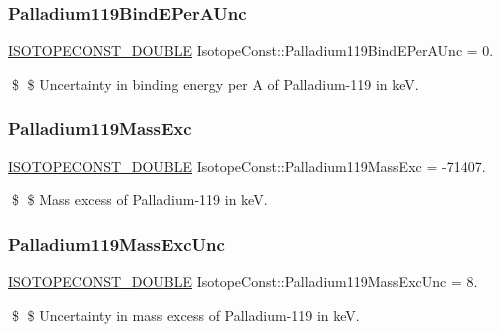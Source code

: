 \subsubsection{\texorpdfstring{Palladium119\+Bind\+E\+Per\+A\+Unc}{Palladium119BindEPerAUnc}}
{\footnotesize\ttfamily \mbox{\hyperlink{group___isotope_const-_macros_ga8f45a7272ce02c0b4c65c44636ed719a}{I\+S\+O\+T\+O\+P\+E\+C\+O\+N\+S\+T\+\_\+\+D\+O\+U\+B\+LE}} Isotope\+Const\+::\+Palladium119\+Bind\+E\+Per\+A\+Unc = 0.}

\$ \$ Uncertainty in binding energy per A of Palladium-\/119 in keV. \mbox{\label{group___isotope_const-_palladium-_pd119_ga68a420347c7b17585263f21ae209e288}} 
\subsubsection{\texorpdfstring{Palladium119\+Mass\+Exc}{Palladium119MassExc}}
{\footnotesize\ttfamily \mbox{\hyperlink{group___isotope_const-_macros_ga8f45a7272ce02c0b4c65c44636ed719a}{I\+S\+O\+T\+O\+P\+E\+C\+O\+N\+S\+T\+\_\+\+D\+O\+U\+B\+LE}} Isotope\+Const\+::\+Palladium119\+Mass\+Exc = -\/71407.}

\$ \$ Mass excess of Palladium-\/119 in keV. \mbox{\label{group___isotope_const-_palladium-_pd119_ga58e3d4bc649b297a4511cd073af84ca7}} 
\subsubsection{\texorpdfstring{Palladium119\+Mass\+Exc\+Unc}{Palladium119MassExcUnc}}
{\footnotesize\ttfamily \mbox{\hyperlink{group___isotope_const-_macros_ga8f45a7272ce02c0b4c65c44636ed719a}{I\+S\+O\+T\+O\+P\+E\+C\+O\+N\+S\+T\+\_\+\+D\+O\+U\+B\+LE}} Isotope\+Const\+::\+Palladium119\+Mass\+Exc\+Unc = 8.}

\$ \$ Uncertainty in mass excess of Palladium-\/119 in keV. \mbox{\label{group___isotope_const-_palladium-_pd119_gaf323475ee1b2456674dfdb34ee3aa26b}} 
